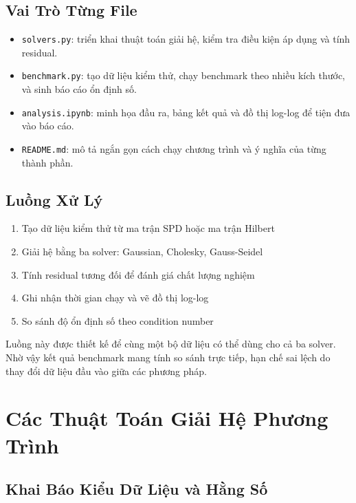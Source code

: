 \documentclass[12pt, a4paper, twoside]{article}
\begin{document}
\subsection{Vai Trò Từng File}

\begin{itemize}
    \item \texttt{solvers.py}: triển khai thuật toán giải hệ, kiểm tra điều kiện áp dụng và tính residual.
    \item \texttt{benchmark.py}: tạo dữ liệu kiểm thử, chạy benchmark theo nhiều kích thước, và sinh báo cáo ổn định số.
    \item \texttt{analysis.ipynb}: minh họa đầu ra, bảng kết quả và đồ thị log-log để tiện đưa vào báo cáo.
    \item \texttt{README.md}: mô tả ngắn gọn cách chạy chương trình và ý nghĩa của từng thành phần.
\end{itemize}

\subsection{Luồng Xử Lý}

\begin{enumerate}
    \item Tạo dữ liệu kiểm thử từ ma trận SPD hoặc ma trận Hilbert
    \item Giải hệ bằng ba solver: Gaussian, Cholesky, Gauss-Seidel
    \item Tính residual tương đối để đánh giá chất lượng nghiệm
    \item Ghi nhận thời gian chạy và vẽ đồ thị log-log
    \item So sánh độ ổn định số theo condition number
\end{enumerate}

Luồng này được thiết kế để cùng một bộ dữ liệu có thể dùng cho cả ba solver. Nhờ vậy kết quả benchmark mang tính so sánh trực tiếp, hạn chế sai lệch do thay đổi dữ liệu đầu vào giữa các phương pháp.

\section{Các Thuật Toán Giải Hệ Phương Trình}

\subsection{Khai Báo Kiểu Dữ Liệu và Hằng Số}
\end{document}
